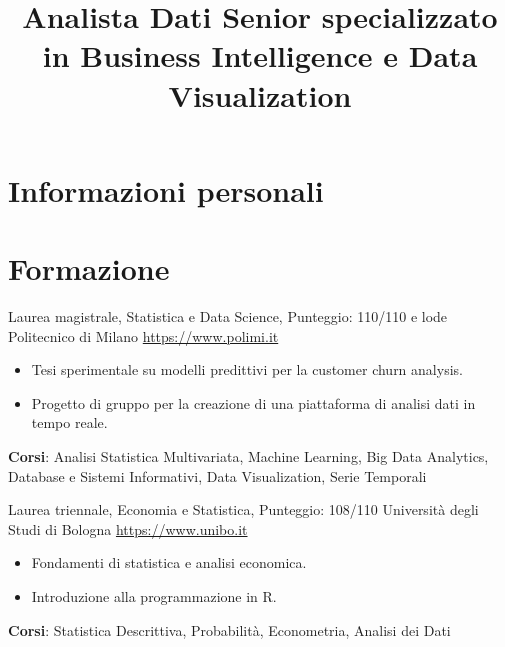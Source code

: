 \documentclass[a4paper, serif, 10pt]{moderncv}
\title{Analista Dati Senior specializzato in Business Intelligence e Data Visualization}
\begin{document}
\maketitle

\section{Informazioni personali}

\section{Formazione}

        {Laurea magistrale, Statistica e Data Science, Punteggio: 110/110 e lode}
        {Politecnico di Milano}
        {\url{https://www.polimi.it}}
        {}
        {\begin{itemize}
\item Tesi sperimentale su modelli predittivi per la customer churn analysis.
\item Progetto di gruppo per la creazione di una piattaforma di analisi dati in tempo reale.
\end{itemize}
\textbf{Corsi}: Analisi Statistica Multivariata, Machine Learning, Big Data Analytics, Database e Sistemi Informativi, Data Visualization, Serie Temporali}

        {Laurea triennale, Economia e Statistica, Punteggio: 108/110}
        {Università degli Studi di Bologna}
        {\url{https://www.unibo.it}}
        {}
        {\begin{itemize}
\item Fondamenti di statistica e analisi economica.
\item Introduzione alla programmazione in R.
\end{itemize}
\textbf{Corsi}: Statistica Descrittiva, Probabilità, Econometria, Analisi dei Dati}
\end{document}
